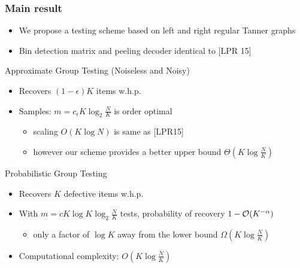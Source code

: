 \begin{frame} \frametitle{Main result}
\begin{itemize}
\item We propose a testing scheme based on left and right regular Tanner graphs
\item Bin detection matrix and peeling decoder identical to [LPR 15]
\end{itemize}

\begin{block}{Approximate Group Testing (Noiseless and Noisy)}
\begin{itemize}
\item Recovers $(1-\epsilon)K$ items w.h.p.
\item Samples: $m = c_{\epsilon}K \log_2 \frac{N}{K}$ is order optimal
\begin{itemize}
\item scaling $O(K \log N)$ is same as [LPR15]
\item however our scheme provides a better upper bound $\Theta(K\log\frac{N}{K})$
\end{itemize}
\end{itemize}
\end{block}

\pause
\begin{block}{Probabilistic Group Testing}
\begin{itemize}
\item Recovers $K$ defective items w.h.p.
\item With $m = cK \log K \log_2 \frac{N}{K}$ tests, probability of recovery $1-\mathcal{O}(K^{-\alpha})$
\begin{itemize}
\item only a factor of $\log K$ away from the lower bound $\Omega(K\log\frac{N}{K})$
\end{itemize}
\end{itemize}
\end{block}

\begin{itemize}
\item<3-> Computational complexity: $O(K \log \frac{N}{K})$
\end{itemize}
\end{frame}

